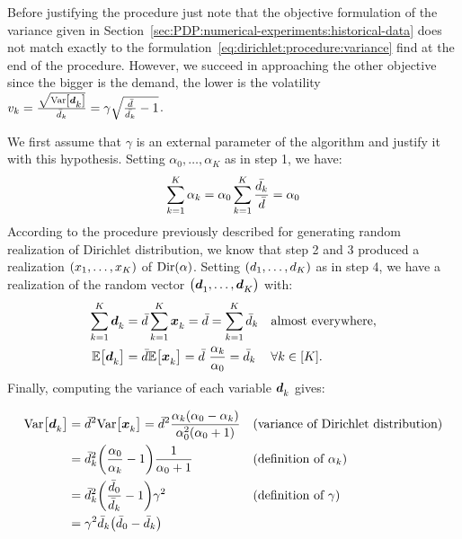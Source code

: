 Before justifying the procedure just note that the objective formulation of the variance given in Section~\ref{sec:PDP:numerical-experiments:historical-data} does not match exactly to the formulation~\eqref{eq:dirichlet:procedure:variance} find at the end of the procedure. However, we succeed in approaching the other objective since the bigger is the demand, the lower is the volatility $v_k=\frac{\sqrt{\vari\sqbracket{\va\demand_k}}}{\bar{\demand}_k} = \gamma\sqrt{\frac{\bar{\demand}}{\bar{\demand_k}}-1}$.


\medskip


We first assume that $\gamma$ is an external parameter of the algorithm and justify it with this hypothesis. Setting $\alpha_0,\ldots,\alpha_K$ as in step 1, we have:
\begin{equation}
  \sum_{k=1}^K \alpha_k = \alpha_0 \sum_{k=1}^K\frac{\bar{d_k}}{\bar{d}} = \alpha_0
\end{equation}
According to the procedure previously described for generating random realization of Dirichlet distribution, we know that step 2 and 3 produced a realization $\bracket{x_1,\ldots,x_K}$ of $\Dir\bracket{\alpha}$. Setting $\bracket{\demand_1,\ldots,\demand_K}$ as in step 4, we have a realization of the random vector $\bracket{\va\demand_1,\ldots,\va\demand_K}$ with:
\begin{align}
  \sum_{k=1}^K \va\demand_k
  &= \bar{\demand} \sum_{k=1}^K \va x_k
  = \bar{\demand}
  = \sum_{k=1}^K \bar{\demand}_k
  && \mbox{almost everywhere},
  \\
  \espe\sqbracket{\va\demand_k}
  &= \bar{\demand}\espe\sqbracket{\va x_k}
  = \bar{\demand}\ \frac{\alpha_k}{\alpha_0}
  = \bar{\demand}_k
  && \forall k\in\range{K}.
\end{align}
Finally, computing the variance of each variable $\va\demand_k$ gives:

\begin{subequations}
\begin{align}
  \vari\sqbracket{\va\demand_k}
  &= \bar{\demand}^2\vari\sqbracket{\va x_k}
  = \bar{\demand}^2
  \frac{\alpha_k\bracket{\alpha_0-\alpha_k}}{\alpha_0^2\bracket{\alpha_0+1}}
  && \mbox{(variance of Dirichlet distribution)}
  \\
  &= \bar{\demand}_k^2 \bracket{\frac{\alpha_0}{\alpha_k}-1}\frac{1}{\alpha_0+1}
  && \mbox{(definition of $\alpha_k$)}
  \\
  &= \bar{\demand}_k^2 \bracket{\frac{\bar{\demand}_0}{\bar{\demand}_k}-1}\gamma^2
  && \mbox{(definition of $\gamma$)}
  \\
  &= \gamma^2 \bar{\demand}_k \bracket{\bar{\demand}_0-\bar{\demand}_k}
\end{align}
\end{subequations}


